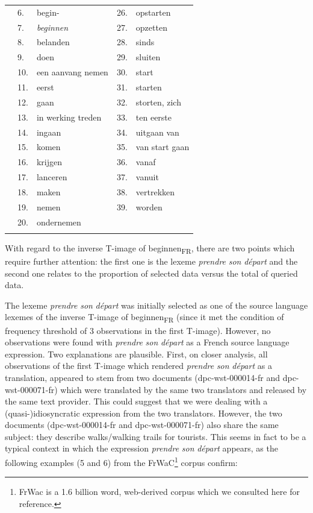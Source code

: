 \begin{table}
\begin{tabularx}{\textwidth}{p{}lXlX}
\rowcolor{lsLightGray}& 6.& begin- & 26.& opstarten\\
\rowcolor{lsLightGray}& 7.& \textit{beginnen} & 27.& opzetten\\
\rowcolor{lsLightGray}& 8.& belanden & 28.& sinds\\
\rowcolor{lsLightGray}& 9.& doen & 29.& sluiten\\
\rowcolor{lsLightGray}& 10.& een aanvang nemen & 30.& start\\
\rowcolor{lsLightGray}& 11.& eerst & 31.& starten\\
\rowcolor{lsLightGray}& 12.& gaan & 32.& storten, zich\\
\rowcolor{lsLightGray}& 13.& in werking treden & 33.& ten eerste\\
\rowcolor{lsLightGray}& 14.& ingaan & 34.& uitgaan van\\
\rowcolor{lsLightGray}& 15.& komen & 35.& van start gaan\\
\rowcolor{lsLightGray}& 16.& krijgen & 36.& vanaf\\
\rowcolor{lsLightGray}& 17.& lanceren & 37.& vanuit\\
\rowcolor{lsLightGray}& 18.& maken & 38.& vertrekken\\
\rowcolor{lsLightGray}& 19.& nemen & 39.& worden\\
\rowcolor{lsLightGray}& 20.& ondernemen && \\
\lspbottomrule
\end{tabularx}
\end{table}

With regard to the inverse T-image of beginnen\textsubscript{FR}, there are two points which require further attention: the first one is the lexeme \textit{prendre} \textit{son} \textit{départ} and the second one relates to the proportion of selected data versus the total of queried data.

The lexeme \textit{prendre} \textit{son} \textit{départ} was initially selected as one of the source language lexemes of the inverse T-image of beginnen\textsubscript{FR} (since it met the condition of frequency threshold of 3 observations in the first T-image). However, no observations were found with \textit{prendre} \textit{son} \textit{départ} as a French source language expression. Two explanations are plausible. First, on closer analysis, all observations of the first T-image which rendered \textit{prendre} \textit{son} \textit{départ} as a translation, appeared to stem from two documents (dpc-wst-000014-fr and dpc-wst-000071-fr) which were translated by the same two translators and released by the same text provider. This could suggest that we were dealing with a (quasi-)idiosyncratic expression from the two translators. However, the two documents (dpc-wst-000014-fr and dpc-wst-000071-fr) also share the same subject: they describe walks/walking trails for tourists. This seems in fact to be a typical context in which the expression \textit{prendre} \textit{son} \textit{départ} appears, as the following examples (5 and 6) from the FrWaC\footnote{FrWac is a 1.6 billion word, web-derived corpus \citep{xiao_web_2010} which we consulted here for reference.} corpus confirm:

